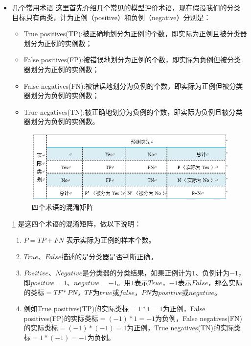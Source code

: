 \begin{itemize}

\item 几个常用术语
这里首先介绍几个常见的模型评价术语，现在假设我们的分类目标只有两类，计为正例（positive）和负例（negative）分别是：

		\begin{itemize}
			\item True positives(TP):被正确地划分为正例的个数，即实际为正例且被分类器划分为正例的实例数；
   		\item False positives(FP):被错误地划分为正例的个数，即实际为负例但被分类器划分为正例的实例数；
   		\item False negatives(FN):被错误地划分为负例的个数，即实际为正例但被分类器划分为负例的实例数；
   		\item True negatives(TN):被正确地划分为负例的个数，即实际为负例且被分类器划分为负例的实例数。　
		\end{itemize}

 \begin{figure}[h]
   \centering
   \includegraphics[width=.7\textwidth]{ch02/img/ch2/2.9/1.png}
   \caption{四个术语的混淆矩阵}
   \label{fig:2.2}
 \end{figure}

		\ref{fig:2.2} 是这四个术语的混淆矩阵，做以下说明：

		\begin{enumerate}
			\item $P=TP+FN$ 表示实际为正例的样本个数。
			\item $True$、$False$描述的是分类器是否判断正确。
			\item $Positive$、$Negative$是分类器的分类结果，如果正例计为$1$、负例计为$-1$，即$positive=1$、$negative=-1$。用$1$表示$True$，$-1$表示$False$，那么实际的类标$=TF*PN$，$TF$为$true$或$false$，$PN$为$positive$或$negative$。
			\item 例如True positives(TP)的实际类标$=1*1=1$为正例，False positives(FP)的实际类标$=(-1)*1=-1$为负例，False negatives(FN)的实际类标$=(-1)*(-1)=1$为正例，True negatives(TN)的实际类标$=1*(-1)=-1$为负例。
		\end{enumerate}


\end{itemize}
